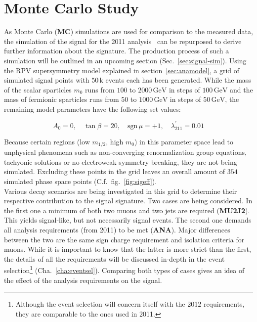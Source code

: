 \section{Monte Carlo Study}
\label{sec:mcstudy}

As Monte Carlo (\textbf{MC}) simulations are used for comparison to the measured data, the simulation of the signal for the 2011 analysis~\cite{2011rpv} can be repurposed to derive further information about the signature. The production process of such a simulation will be outlined in an upcoming section (Sec.~\ref{sec:signal-sim}). Using the RPV supersymmetry model explained in section~\ref{sec:anamodel}, a grid of simulated signal points with $50\,\text{k}$ events each has been generated. While the mass of the scalar sparticles $m_0$ runs from $100$ to $2000\,\text{GeV}$ in steps of $100\,\text{GeV}$ and the mass of fermionic sparticles runs from $50$ to $1000\,\text{GeV}$ in steps of $50\,\text{GeV}$, the remaining model parameters have the following set values:

\begin{equation*}
  A_0 = 0, \quad \tan{\beta} = 20, \quad \text{sgn}\,\mu = +1, \quad \lambda^\prime_{211} = 0.01
\end{equation*}

Because certain regions (low $m_{1/2}$, high $m_0$) in this parameter space lead to unphysical phenomena such as non-converging renormalization group equations, tachyonic solutions or no electroweak symmetry breaking, they are not being simulated. Excluding these points in the grid leaves an overall amount of $354$ simulated phase space points (C.f.~fig.~\ref{fig:sigeff}). \\

Various decay scenarios are being investigated in this grid to determine their respective contribution to the signal signature. Two cases are being considered. In the first one a minimum of both two muons and two jets are required (\textbf{MU2J2}). This yields signal-like, but not necessarily signal events. The second one demands all analysis requirements (from 2011) to be met (\textbf{ANA}). Major differences between the two are the same sign charge requirement and isolation criteria for muons. While it is important to know that the latter is more strict than the first, the details of all the requirements will be discussed in-depth in the event selection\footnote{Although the event selection will concern itself with the 2012 requirements, they are comparable to the ones used in 2011.} (Cha.~\ref{cha:eventsel}). Comparing both types of cases gives an idea of the effect of the analysis requirements on the signal.

